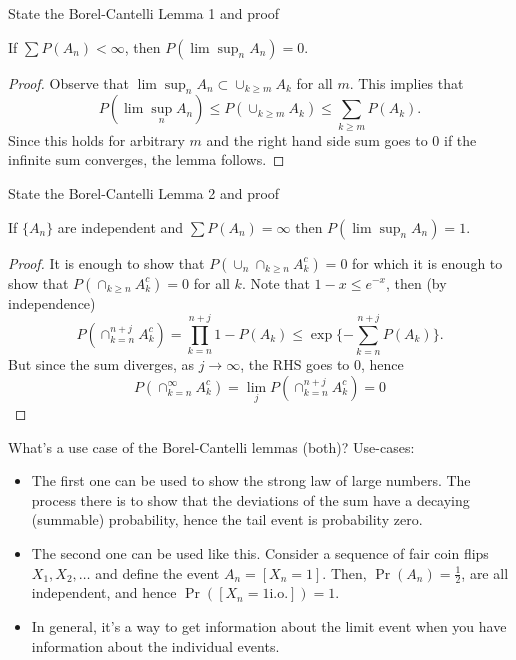 \documentclass[avery5388,grid,frame]{flashcards}
\begin{document}
\begin{flashcard}
    {State the Borel-Cantelli Lemma 1 and proof}
    \begin{theorem}
        If $\sum P(A_n) < \infty$, then $P(\lim \sup_n A_n) = 0$.
    \end{theorem}

    \begin{proof}
        Observe that $\lim \sup_n A_n \subset \cup_{k \geq m} A_k$ for all $m$.
        This implies that
        $$P(\lim \sup_n A_n) \leq P(\cup_{k \geq m} A_k) \leq \sum_{k \geq m} P(A_k).$$
        Since this holds for arbitrary $m$ and the right hand side sum goes to $0$ if the infinite sum converges, the lemma follows.
    \end{proof}
\end{flashcard}


\begin{flashcard}
    {State the Borel-Cantelli Lemma 2 and proof}
    \begin{theorem}
        If $\{ A_n \}$ are independent and $\sum P(A_n) = \infty$ then $P(\lim \sup_n A_n) = 1$.
    \end{theorem}

    \begin{proof}
        It is enough to show that $P(\cup_n \cap_{k \geq n} A_k^c) = 0$ for which it is enough to show that $P(\cap_{k \geq n} A_k^c) = 0$ for all $k$. Note that $1 - x \leq e^{-x}$, then (by independence)
        $$P(\cap_{k = n}^{n + j} A_k^c) = \prod_{k = n}^{n+j} 1 - P(A_k) \leq \exp \{ - \sum_{k = n}^{n + j} P(A_k) \}.$$
        But since the sum diverges, as $j \rightarrow \infty$, the RHS goes to 0, hence
        $$P( \cap_{k=n}^\infty A_k^c ) = \lim_j P(\cap_{k=n}^{n+j} A_k^c) = 0$$
    \end{proof}
\end{flashcard}


\begin{flashcard}
    {What's a use case of the Borel-Cantelli lemmas (both)?}
    Use-cases:
    \begin{itemize}
        \item The first one can be used to show the strong law of large numbers. The process there is to show that the deviations of the sum have a decaying (summable) probability, hence the tail event is probability zero.
        \item The second one can be used like this. Consider a sequence of fair coin flips $X_1, X_2, \dots$ and define the event $A_n = [X_n = 1]$. Then, $\Pr(A_n) = \frac 1 2$, are all independent, and hence $\Pr( [X_n = 1 \text{i.o.}] ) = 1$.
        \item In general, it's a way to get information about the limit event when you have information about the individual events.
    \end{itemize}
\end{flashcard}
\end{document}
